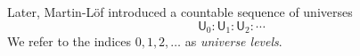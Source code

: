\documentclass[11pt,a4paper]{article}
\theoremstyle{definition}
\newcommand{\UU}{\mathsf{U}}
\newcommand{\ttt}[1]{\text{\tt #1}}
\begin{document}


Later, Martin-L\"of \cite{martinlof:predicative} introduced a countable sequence of universes
$$
\UU_0 : \UU_1 : \UU_2 : \cdots
$$
We refer to the indices $0, 1, 2, \ldots$ as {\em universe levels}.
\end{document}
